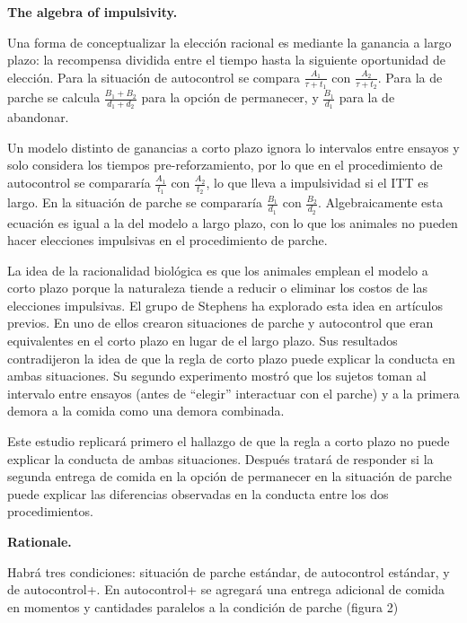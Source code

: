 \documentclass[a4paper,12pt]{article}
\begin{document}
{\bfseries The algebra of impulsivity.}

Una forma de conceptualizar la elección racional es mediante la ganancia a largo plazo: la recompensa dividida entre el tiempo hasta la siguiente oportunidad de elección. Para la situación de autocontrol se compara $\frac{A_{1}}{\tau + t_{1}}$ con $\frac{A_{2}}{\tau + t_{2}}$. Para la de parche se calcula $\frac{B_{1} + B_{2}}{d_{1} + d_{2}}$ para la opción de permanecer, y $\frac{B_{1}}{d_{1}}$ para la de abandonar.

Un modelo distinto de ganancias a corto plazo ignora lo intervalos entre ensayos y solo considera los tiempos pre-reforzamiento, por lo que en el procedimiento de autocontrol se compararía $\frac{A_{1}}{t_{1}}$ con $\frac{A_{2}}{t_{2}}$, lo que lleva a impulsividad si el ITT es largo. En la situación de parche se compararía $\frac{B_{1}}{d_{1}}$ con $\frac{B_{2}}{d_{2}}$. Algebraicamente esta ecuación es igual a la del modelo a largo plazo, con lo que los animales no pueden hacer elecciones impulsivas en el procedimiento de parche.

La idea de la racionalidad biológica es que los animales emplean el modelo a corto plazo porque la naturaleza tiende a reducir o eliminar los costos de las elecciones impulsivas. El grupo de Stephens ha explorado esta idea en artículos previos. En uno de ellos crearon situaciones de parche y autocontrol que eran equivalentes en el corto plazo en lugar de el largo plazo. Sus resultados contradijeron la idea de que la regla de corto plazo puede explicar la conducta en ambas situaciones. Su segundo experimento mostró que los sujetos toman al intervalo entre ensayos (antes de ``elegir'' interactuar con el parche) y a la primera demora a la comida como una demora combinada.

Este estudio replicará primero el hallazgo de que la regla a corto plazo no puede explicar la conducta de ambas situaciones. Después tratará de responder si la segunda entrega de comida en la opción de permanecer en la situación de parche puede explicar las diferencias observadas en la conducta entre los dos procedimientos.

{\bfseries Rationale.}

Habrá tres condiciones: situación de parche estándar, de autocontrol estándar, y de autocontrol+. En autocontrol+ se agregará una entrega adicional de comida en momentos y cantidades paralelos a la condición de parche (figura 2)
\end{document}
